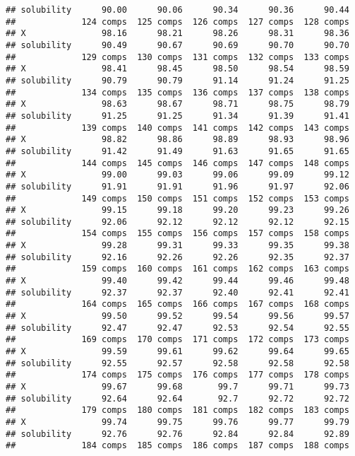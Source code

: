 \documentclass[]{article}
\begin{document}
\begin{verbatim}
## solubility      90.00      90.06      90.34      90.36      90.44
##             124 comps  125 comps  126 comps  127 comps  128 comps
## X               98.16      98.21      98.26      98.31      98.36
## solubility      90.49      90.67      90.69      90.70      90.70
##             129 comps  130 comps  131 comps  132 comps  133 comps
## X               98.41      98.45      98.50      98.54      98.59
## solubility      90.79      90.79      91.14      91.24      91.25
##             134 comps  135 comps  136 comps  137 comps  138 comps
## X               98.63      98.67      98.71      98.75      98.79
## solubility      91.25      91.25      91.34      91.39      91.41
##             139 comps  140 comps  141 comps  142 comps  143 comps
## X               98.82      98.86      98.89      98.93      98.96
## solubility      91.42      91.49      91.63      91.65      91.65
##             144 comps  145 comps  146 comps  147 comps  148 comps
## X               99.00      99.03      99.06      99.09      99.12
## solubility      91.91      91.91      91.96      91.97      92.06
##             149 comps  150 comps  151 comps  152 comps  153 comps
## X               99.15      99.18      99.20      99.23      99.26
## solubility      92.06      92.12      92.12      92.12      92.15
##             154 comps  155 comps  156 comps  157 comps  158 comps
## X               99.28      99.31      99.33      99.35      99.38
## solubility      92.16      92.26      92.26      92.35      92.37
##             159 comps  160 comps  161 comps  162 comps  163 comps
## X               99.40      99.42      99.44      99.46      99.48
## solubility      92.37      92.37      92.40      92.41      92.41
##             164 comps  165 comps  166 comps  167 comps  168 comps
## X               99.50      99.52      99.54      99.56      99.57
## solubility      92.47      92.47      92.53      92.54      92.55
##             169 comps  170 comps  171 comps  172 comps  173 comps
## X               99.59      99.61      99.62      99.64      99.65
## solubility      92.55      92.57      92.58      92.58      92.58
##             174 comps  175 comps  176 comps  177 comps  178 comps
## X               99.67      99.68       99.7      99.71      99.73
## solubility      92.64      92.64       92.7      92.72      92.72
##             179 comps  180 comps  181 comps  182 comps  183 comps
## X               99.74      99.75      99.76      99.77      99.79
## solubility      92.76      92.76      92.84      92.84      92.89
##             184 comps  185 comps  186 comps  187 comps  188 comps

\end{verbatim}
\end{document}
